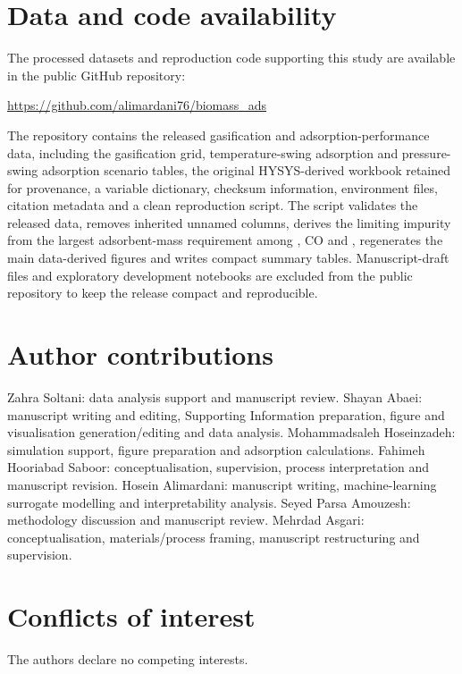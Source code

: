 \documentclass[11pt,a4paper]{article}
\newcommand{\COtwo}{\ce{CO2}}
\newcommand{\CHfour}{\ce{CH4}}
\newcommand{\TSA}{temperature-swing adsorption}
\newcommand{\PSA}{pressure-swing adsorption}
\begin{document}
\section*{Data and code availability}
The processed datasets and reproduction code supporting this study are available in the public GitHub repository:
\begin{center}
\url{https://github.com/alimardani76/biomass_ads}
\end{center}
The repository contains the released gasification and adsorption-performance data, including the gasification grid, \TSA{} and \PSA{} scenario tables, the original HYSYS-derived workbook retained for provenance, a variable dictionary, checksum information, environment files, citation metadata and a clean reproduction script. The script validates the released data, removes inherited unnamed columns, derives the limiting impurity from the largest adsorbent-mass requirement among \CHfour, CO and \COtwo, regenerates the main data-derived figures and writes compact summary tables. Manuscript-draft files and exploratory development notebooks are excluded from the public repository to keep the release compact and reproducible.

\section*{Author contributions}
Zahra Soltani: data analysis support and manuscript review.
Shayan Abaei: manuscript writing and editing, Supporting Information preparation, figure and visualisation generation/editing and data analysis.
Mohammadsaleh Hoseinzadeh: simulation support, figure preparation and adsorption calculations.
Fahimeh Hooriabad Saboor: conceptualisation, supervision, process interpretation and manuscript revision.
Hosein Alimardani: manuscript writing, machine-learning surrogate modelling and interpretability analysis.
Seyed Parsa Amouzesh: methodology discussion and manuscript review.
Mehrdad Asgari: conceptualisation, materials/process framing, manuscript restructuring and supervision.

\section*{Conflicts of interest}
The authors declare no competing interests.

\newpage


\end{document}
